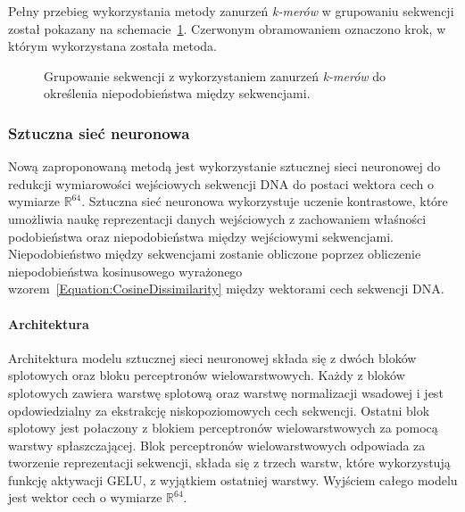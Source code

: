             Pełny przebieg wykorzystania metody zanurzeń \textit{k-merów} w grupowaniu sekwencji został pokazany na schemacie~\ref{Picture:Cluster:KMer}. Czerwonym obramowaniem oznaczono krok, w którym wykorzystana została metoda.


            \begin{figure}
                \begin{center}
                    
                \end{center}
                \caption{
                    Grupowanie sekwencji z wykorzystaniem zanurzeń \textit{k-merów} do określenia niepodobieństwa między sekwencjami.
                }\label{Picture:Cluster:KMer}
            \end{figure}

        \subsubsection{Sztuczna sieć neuronowa}

            Nową zaproponowaną metodą jest wykorzystanie sztucznej sieci neuronowej do redukcji wymiarowości wejściowych sekwencji DNA do postaci wektora cech o wymiarze $\mathbb{R}^{64}$. Sztuczna sieć neuronowa wykorzystuje uczenie kontrastowe\cite{}, które umożliwia naukę reprezentacji danych wejściowych z zachowaniem właśności podobieństwa oraz niepodobieństwa między wejściowymi sekwencjami. Niepodobieństwo między sekwencjami zostanie obliczone poprzez obliczenie niepodobieństwa kosinusowego wyrażonego wzorem~\eqref{Equation:CosineDissimilarity} między wektorami cech sekwencji DNA.

            \paragraph{Architektura}
                Architektura modelu sztucznej sieci neuronowej składa się z dwóch bloków splotowych oraz bloku perceptronów wielowarstwowych. Każdy z bloków splotowych zawiera warstwę splotową oraz warstwę normalizacji wsadowej i jest opdowiedzialny za ekstrakcję niskopoziomowych cech sekwencji. Ostatni blok splotowy jest połaczony z blokiem perceptronów wielowarstwowych za pomocą warstwy spłaszczającej. Blok perceptronów wielowarstwowych odpowiada za tworzenie reprezentacji sekwencji, składa się z trzech warstw, które wykorzystują funkcję aktywacji GELU\cite{GELU}, z wyjątkiem ostatniej warstwy. Wyjściem całego modelu jest wektor cech o wymiarze $\mathbb{R}^{64}$.

